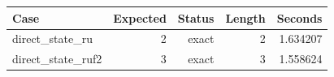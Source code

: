 {\small
\begin{tabular}{lrrrr}
\hline
Case & Expected & Status & Length & Seconds \\
\hline
direct\_state\_ru & 2 & exact & 2 & 1.634207 \\
direct\_state\_ruf2 & 3 & exact & 3 & 1.558624 \\
\hline
\end{tabular}
}
